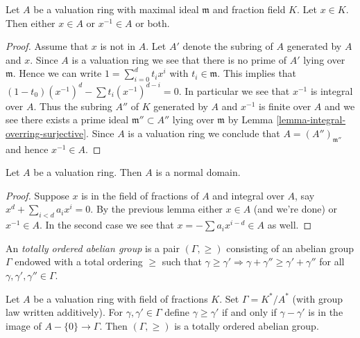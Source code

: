 \begin{lemma}
\label{lemma-valuation-ring-x-or-x-inverse}
Let $A$ be a valuation ring with maximal ideal $\mathfrak m$ and
fraction field $K$.
Let $x \in K$. Then either $x \in A$ or $x^{-1} \in A$ or both.
\end{lemma}

\begin{proof}
Assume that $x$ is not in $A$.
Let $A'$ denote the subring of $A$ generated by $A$ and $x$.
Since $A$ is a valuation ring we see that there is no prime
of $A'$ lying over $\mathfrak m$. Hence we can write
$1 = \sum_{i = 0}^d t_i x^i$ with $t_i \in \mathfrak m$.
This implies that $(1 - t_0) (x^{-1})^d - \sum t_i (x^{-1})^{d - i} = 0$.
In particular we see that $x^{-1}$ is integral over $A$.
Thus the subring $A''$ of $K$ generated by $A$ and $x^{-1}$ is
finite over $A$ and we see there exists a prime ideal
$\mathfrak m'' \subset A''$ lying over $\mathfrak m$ by
Lemma \ref{lemma-integral-overring-surjective}. Since $A$
is a valuation ring we conclude that $A = (A'')_{\mathfrak m''}$
and hence $x^{-1} \in A$.
\end{proof}

\begin{lemma}
\label{lemma-valuation-ring-normal}
Let $A$ be a valuation ring.
Then $A$ is a normal domain.
\end{lemma}

\begin{proof}
Suppose $x$ is in the field of fractions of $A$ and integral over $A$,
say $x^d + \sum_{i < d} a_i x^i = 0$. By the previous lemma either
$x \in A$ (and we're done) or $x^{-1} \in A$. In the second case
we see that $x = - \sum a_i x^{i - d} \in A$ as well.
\end{proof}

\noindent
An {\it totally ordered abelian group} is a pair $(\Gamma, \geq)$
consisting of an abelian group $\Gamma$ endowed with a total
ordering $\geq$ such that $\gamma \geq \gamma' \Rightarrow
\gamma + \gamma'' \geq \gamma' + \gamma''$ for all
$\gamma, \gamma', \gamma'' \in \Gamma$.

\begin{lemma}
\label{lemma-valuation-group}
Let $A$ be a valuation ring with field of fractions $K$.
Set $\Gamma = K^*/A^*$ (with group law written additively).
For $\gamma, \gamma' \in \Gamma$
define $\gamma \geq \gamma'$ if and only if
$\gamma - \gamma'$ is in the image of $A - \{0\} \to \Gamma$.
Then $(\Gamma, \geq)$ is a totally ordered abelian group.
\end{lemma}

